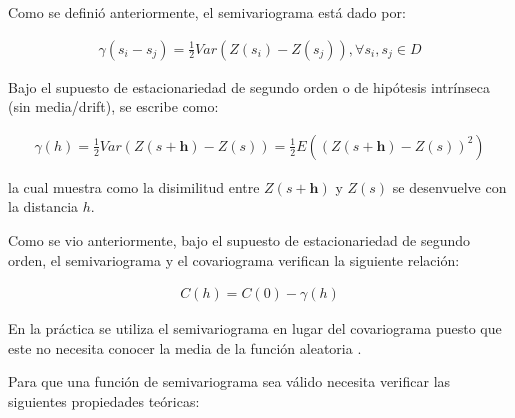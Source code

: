 \documentclass[
]{book}
\begin{document}
Como se definió anteriormente, el semivariograma está dado por:

\begin{align}
  \gamma(s_i-s_j)=\frac{1}{2}Var(Z(s_i)-Z(s_j)),\forall s_i,s_j \in D  
\end{align}

Bajo el supuesto de estacionariedad de segundo orden o de hipótesis intrínseca (sin media/drift), se escribe como:

\begin{align}
  \gamma(h)=\frac{1}{2}Var(Z(s+\textbf{h})-Z(s))=\frac{1}{2}E((Z(s+\textbf{h})-Z(s))^2)  
\end{align}

la cual muestra como la disimilitud entre \(Z(s+\textbf{h})\) y \(Z(s)\) se desenvuelve con la distancia \(h\).

Como se vio anteriormente, bajo el supuesto de estacionariedad de segundo orden, el semivariograma y el covariograma verifican la siguiente relación:

\begin{align}
  C(h)=C(0)-\gamma(h)  
\end{align}

En la práctica se utiliza el semivariograma en lugar del covariograma puesto que este no necesita conocer la media de la función aleatoria \citep{montero}.

Para que una función de semivariograma sea válido necesita verificar las siguientes propiedades teóricas:
\end{document}
